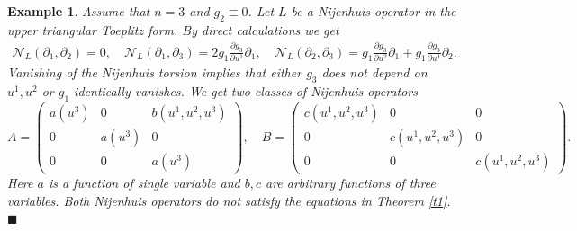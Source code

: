 \documentclass[12pt]{article}
\newtheorem{Ex}{Example}[section]
\theoremstyle{remark}
\newcommand{\pd}[2]{\frac{\partial#1}{\partial#2}}
\begin{document}
\begin{Ex}\label{ex1}
\rm{
Assume that $n = 3$ and $g_{2} \equiv 0$. Let $L$ be a Nijenhuis operator in the upper triangular Toeplitz form. By direct calculations we get
$$
\begin{aligned}
\mathcal N_L(\partial_1, \partial_2) = 0, \quad  \mathcal N_L(\partial_1, \partial_3) = 2 g_1 \pd{g_3}{u^1} \partial_1, \quad  \mathcal N_L(\partial_2, \partial_3) = g_1 \pd{g_3}{u^2} \partial_1 + g_1 \pd{g_3}{u^1} \partial_2.
\end{aligned}
$$
Vanishing of the Nijenhuis torsion implies that either $g_3$ does not depend on $u^1, u^2$ or $g_1$ identically vanishes. We get two classes of Nijenhuis operators
$$
A = \left(\begin{array}{ccc}
     a(u^3) & 0 & b(u^1, u^2, u^3) \\
     0 & a(u^3) & 0 \\
     0 & 0 & a(u^3)
\end{array}\right), \quad B = \left(\begin{array}{ccc}
     c(u^1, u^2, u^3) & 0 & 0 \\
     0 & c(u^1, u^2, u^3) & 0 \\
     0 & 0 & c(u^1, u^2, u^3)
\end{array}\right).
$$
Here $a$ is a function of single variable and $b, c$ are arbitrary functions of three variables. Both Nijenhuis operators do not satisfy the equations in Theorem \ref{t1}. $\blacksquare$
}    
\end{Ex}
\end{document}
